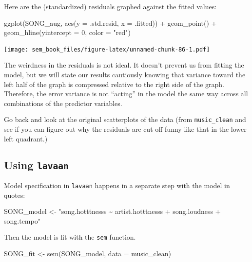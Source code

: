\documentclass[
]{book}
\newenvironment{Shaded}{\begin{snugshade}}{\end{snugshade}}
\newcommand{\AttributeTok}[1]{\textcolor[rgb]{0.77,0.63,0.00}{#1}}
\newcommand{\DecValTok}[1]{\textcolor[rgb]{0.00,0.00,0.81}{#1}}
\newcommand{\FunctionTok}[1]{\textcolor[rgb]{0.00,0.00,0.00}{#1}}
\newcommand{\NormalTok}[1]{#1}
\newcommand{\OtherTok}[1]{\textcolor[rgb]{0.56,0.35,0.01}{#1}}
\newcommand{\SpecialCharTok}[1]{\textcolor[rgb]{0.00,0.00,0.00}{#1}}
\newcommand{\StringTok}[1]{\textcolor[rgb]{0.31,0.60,0.02}{#1}}
\begin{document}
Here are the (standardized) residuals graphed against the fitted values:

\begin{Shaded}
\begin{Highlighting}[]
\FunctionTok{ggplot}\NormalTok{(SONG\_aug, }\FunctionTok{aes}\NormalTok{(}\AttributeTok{y =}\NormalTok{ .std.resid, }\AttributeTok{x =}\NormalTok{ .fitted)) }\SpecialCharTok{+}
    \FunctionTok{geom\_point}\NormalTok{() }\SpecialCharTok{+}
    \FunctionTok{geom\_hline}\NormalTok{(}\AttributeTok{yintercept =} \DecValTok{0}\NormalTok{, }\AttributeTok{color =} \StringTok{"red"}\NormalTok{)}
\end{Highlighting}
\end{Shaded}

\texttt{[image: sem\_book\_files/figure-latex/unnamed-chunk-86-1.pdf]}

The weirdness in the residuals is not ideal. It doesn't prevent us from fitting the model, but we will state our results cautiously knowing that variance toward the left half of the graph is compressed relative to the right side of the graph. Therefore, the error variance is not ``acting'' in the model the same way across all combinations of the predictor variables.

Go back and look at the original scatterplots of the data (from \texttt{music\_clean} and see if you can figure out why the residuals are cut off funny like that in the lower left quadrant.)

\hypertarget{multiple-r-lavaan}{%
\subsection{\texorpdfstring{Using \texttt{lavaan}}{Using lavaan}}\label{multiple-r-lavaan}}

Model specification in \texttt{lavaan} happens in a separate step with the model in quotes:

\begin{Shaded}
\begin{Highlighting}[]
\NormalTok{SONG\_model }\OtherTok{\textless{}{-}} \StringTok{"song.hotttnesss \textasciitilde{} artist.hotttnesss +}
\StringTok{    song.loudness + }
\StringTok{    song.tempo"} 
\end{Highlighting}
\end{Shaded}

Then the model is fit with the \texttt{sem} function.

\begin{Shaded}
\begin{Highlighting}[]
\NormalTok{SONG\_fit }\OtherTok{\textless{}{-}} \FunctionTok{sem}\NormalTok{(SONG\_model, }\AttributeTok{data =}\NormalTok{ music\_clean)}
\end{Highlighting}
\end{Shaded}
\end{document}
